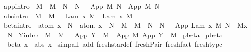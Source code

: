 \begin{isabellebody}
{\isacharbar}\ app{\isacharbrackleft}intro{\isacharbrackright}{\isacharcolon}\ {\isachardoublequoteopen}{\isasymlbrakk}\ M\ {\isasymggreater}\ M{\isacharprime}\ {\isacharsemicolon}\ N\ {\isasymggreater}\ N{\isacharprime}\ {\isasymrbrakk}\ {\isasymLongrightarrow}\ App\ M\ N\ {\isasymggreater}\ App\ M{\isacharprime}\ N{\isacharprime}{\isachardoublequoteclose}\isanewline
{\isacharbar}\ abs{\isacharbrackleft}intro{\isacharbrackright}{\isacharcolon}\ {\isachardoublequoteopen}{\isasymlbrakk}\ M\ {\isasymggreater}\ M{\isacharprime}\ {\isasymrbrakk}\ {\isasymLongrightarrow}\ Lam\ {\isacharbrackleft}x{\isacharbrackright}{\isachardot}\ M\ {\isasymggreater}\ Lam\ {\isacharbrackleft}x{\isacharbrackright}{\isachardot}\ M{\isacharprime}{\isachardoublequoteclose}\isanewline
{\isacharbar}\ beta{\isacharbrackleft}intro{\isacharbrackright}{\isacharcolon}\ {\isachardoublequoteopen}{\isasymlbrakk}\ atom\ x\ {\isasymsharp}\ N\ {\isacharsemicolon}\ atom\ x\ {\isasymsharp}\ N{\isacharprime}\ {\isacharsemicolon}\ M\ {\isasymggreater}\ M{\isacharprime}\ {\isacharsemicolon}\ N\ {\isasymggreater}\ N{\isacharprime}\ {\isasymrbrakk}\ {\isasymLongrightarrow}\ App\ {\isacharparenleft}Lam\ {\isacharbrackleft}x{\isacharbrackright}{\isachardot}\ M{\isacharparenright}\ N\ {\isasymggreater}\ M{\isacharprime}{\isacharbrackleft}x\ {\isacharcolon}{\isacharcolon}{\isacharequal}\ N{\isacharprime}{\isacharbrackright}{\isachardoublequoteclose}\isanewline
{\isacharbar}\ Y{\isacharbrackleft}intro{\isacharbrackright}{\isacharcolon}\ {\isachardoublequoteopen}{\isasymlbrakk}\ M\ {\isasymggreater}\ M{\isacharprime}\ {\isasymrbrakk}\ {\isasymLongrightarrow}\ App\ {\isacharparenleft}Y\ {\isasymsigma}{\isacharparenright}\ M\ {\isasymggreater}\ App\ M{\isacharprime}\ {\isacharparenleft}App\ {\isacharparenleft}Y\ {\isasymsigma}{\isacharparenright}\ M{\isacharprime}{\isacharparenright}{\isachardoublequoteclose}\isanewline
{}\isamarkupfalse%
\ pbeta\isanewline
\isanewline
{}\isamarkupfalse%
\ pbeta\isanewline
\ \ beta{\isacharcolon}\ {\isachardoublequoteopen}x{\isachardoublequoteclose}\ {\isacharbar}\ abs{\isacharcolon}\ {\isachardoublequoteopen}x{\isachardoublequoteclose}\isanewline
%
\isadelimproof
%
\endisadelimproof
%
\isatagproof
{}\isamarkupfalse%
\ {\isacharparenleft}simp{\isacharunderscore}all\ add{\isacharcolon}\ fresh{\isacharunderscore}star{\isacharunderscore}def\ fresh{\isacharunderscore}Pair\ fresh{\isacharunderscore}fact\ fresh{\isacharunderscore}type{\isacharparenright}%
\endisatagproof
{\isafoldproof}%

\end{isabellebody}
